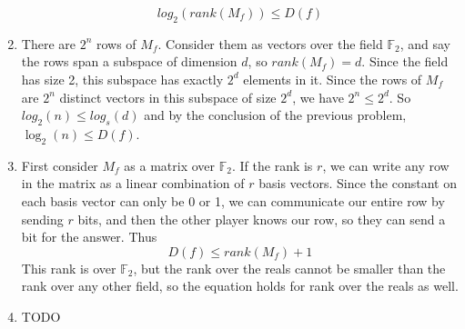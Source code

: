 \documentclass{article}
\newenvironment{problem}[2][Problem]{\begin{trivlist}
\item[\hskip \labelsep {\bfseries #1}\hskip \labelsep {\bfseries #2.}]}{\end{trivlist}}
\begin{document}
\begin{problem}{1}
\begin{enumerate}
      \begin{equation}
        log_2(rank(M_f)) \leq D(f)
      \end{equation}
    \item There are $2^n$ rows of $M_f$. Consider them as vectors over the field
      $\mathbb{F}_2$, and say the rows span a
      subspace of dimension $d$, so $rank(M_f) = d$. Since the field has size 2, this
      subspace has exactly $2^d$ elements in
      it. Since the rows of $M_f$ are $2^n$ distinct vectors in this
      subspace of size $2^d$, we have $2^n \leq 2^d$. So
      $log_2(n) \leq log_s(d)$ and by the conclusion of the previous
      problem, $\log_2(n) \leq D(f)$.
    \item First consider $M_f$ as a matrix over $\mathbb{F}_2$. If the
      rank is $r$, we can write any row in the matrix as a linear
      combination of $r$ basis vectors. Since the constant on each
      basis vector can only be 0 or 1, we can communicate our
      entire row by sending $r$ bits, and then the other player
      knows our row, so they can send a bit for the answer. Thus
      \begin{equation}
        D(f) \leq rank(M_f) + 1
      \end{equation}
      This rank is over $\mathbb{F}_2$, but the rank over the reals
      cannot be smaller than the rank over any other field, so the
      equation holds for rank over the reals as well.
    \item TODO
  \end{enumerate}
\end{problem}
\end{document}
